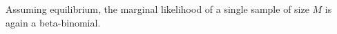 \documentclass[preprint]{elsarticle}
\newcommand\given{{\,|\,}}
\begin{document}
Assuming equilibrium, the marginal likelihood of a single sample of size $M$ is again a beta-binomial.
\end{document}
